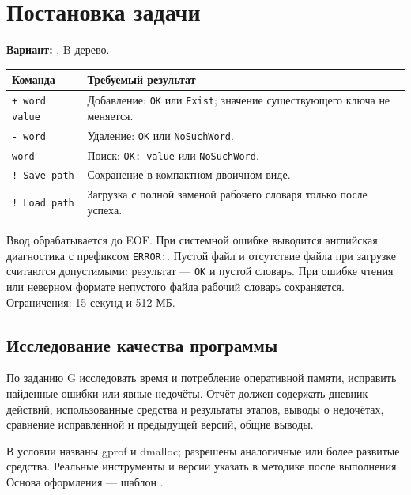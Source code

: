 \section{Постановка задачи}

\textbf{Вариант:} \VariantNumber, B-дерево.

\begin{tabularx}{\linewidth}{@{}p{35mm}Y@{}}
\hline
Команда & Требуемый результат \\
\hline
\texttt{+ word value} & Добавление: \texttt{OK} или \texttt{Exist}; значение существующего ключа не меняется. \\
\texttt{- word} & Удаление: \texttt{OK} или \texttt{NoSuchWord}. \\
\texttt{word} & Поиск: \texttt{OK: value} или \texttt{NoSuchWord}. \\
\texttt{! Save path} & Сохранение в компактном двоичном виде. \\
\texttt{! Load path} & Загрузка с полной заменой рабочего словаря только после успеха. \\
\hline
\end{tabularx}

Ввод обрабатывается до EOF. При системной ошибке выводится английская
диагностика с префиксом \texttt{ERROR:}. Пустой файл и отсутствие файла
при загрузке считаются допустимыми: результат --- \texttt{OK} и пустой словарь.
При ошибке чтения или неверном формате непустого файла рабочий словарь
сохраняется. Ограничения: 15 секунд и 512 МБ.

\subsection{Исследование качества программы}
По заданию G исследовать время и потребление оперативной памяти,
исправить найденные ошибки или явные недочёты. Отчёт должен содержать
дневник действий, использованные средства и результаты этапов,
выводы о недочётах, сравнение исправленной и предыдущей версий, общие выводы.

В условии названы gprof и dmalloc; разрешены аналогичные или более развитые
средства. Реальные инструменты и версии указать в методике после выполнения.
Основа оформления --- шаблон \cite{reportpattern}.
